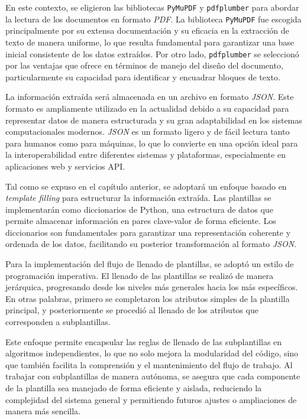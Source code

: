 En este contexto, se eligieron las bibliotecas \texttt{PyMuPDF} y \texttt{pdfplumber} para 
abordar la lectura de los documentos en formato \textit{PDF}. La biblioteca \texttt{PyMuPDF} 
fue escogida principalmente por su extensa documentación y su eficacia en la extracción de 
texto de manera uniforme, lo que resulta fundamental para garantizar una base inicial 
consistente de los datos extraídos. Por otro lado, \texttt{pdfplumber} se seleccionó por las 
ventajas que ofrece en términos de manejo del diseño del documento, particularmente su 
capacidad para identificar y encuadrar bloques de texto.

La información extraída será almacenada en un archivo en formato \textit{JSON}. Este formato 
es ampliamente utilizado en la actualidad debido a su capacidad para representar datos de 
manera estructurada y su gran adaptabilidad en los sistemas computacionales modernos. 
\textit{JSON} es un formato ligero y de fácil lectura tanto para humanos como para máquinas, 
lo que lo convierte en una opción ideal para la interoperabilidad entre diferentes sistemas 
y plataformas, especialmente en aplicaciones web y servicios API.

Tal como se expuso en el capítulo anterior, se adoptará un enfoque basado en \textit{template filling} 
para estructurar la información extraída. Las plantillas se implementarán como diccionarios de Python, 
una estructura de datos que permite almacenar información en pares clave-valor de forma eficiente. 
Los diccionarios son fundamentales para garantizar una representación coherente y ordenada de los datos, 
facilitando su posterior transformación al formato \textit{JSON}.

Para la implementación del flujo de llenado de plantillas, se adoptó un estilo de programación imperativa. 
El llenado de las plantillas 
se realizó de manera jerárquica, progresando desde los niveles más generales hacia los más específicos. 
En otras palabras, primero se completaron los atributos simples de la plantilla principal, y posteriormente 
se procedió al llenado de los atributos que corresponden a subplantillas.

Este enfoque permite encapsular las reglas de llenado de las subplantillas en algoritmos independientes, 
lo que no solo mejora la modularidad del código, sino que también facilita la comprensión y el mantenimiento 
del flujo de trabajo. Al trabajar con subplantillas de manera autónoma, se asegura que cada componente de la 
plantilla sea manejado de forma eficiente y aislada, reduciendo la complejidad del sistema general y permitiendo 
futuros ajustes o ampliaciones de manera más sencilla.

